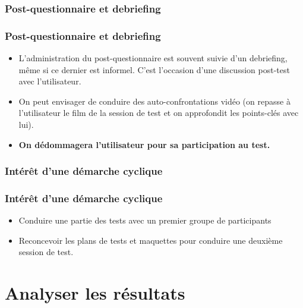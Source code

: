 \subsubsection{Post-questionnaire et debriefing} 
		
		\begin{frame}[allowframebreaks]
		\frametitle{Post-questionnaire et debriefing \citep{ergolab2014a}}
					\begin {itemize}
				      \item L'administration du post-questionnaire est souvent suivie d'un debriefing, même si ce dernier est informel. C'est l'occasion d'une discussion post-test avec l'utilisateur.
					\item On peut envisager de conduire des auto-confrontations vidéo (on repasse à l'utilisateur le film de la session de test et on approfondit les points-clés avec lui).
					\item \textbf{On dédommagera l'utilisateur pour sa participation au test. }
				   	\end{itemize}	
		\end{frame}   
		
\subsubsection{Intérêt d'une démarche cyclique} 
		
		\begin{frame}[allowframebreaks]
		\frametitle{Intérêt d'une démarche cyclique \citep{ergolab2014a}}
					\begin {itemize}
				      \item Conduire une partie des tests avec un premier groupe de participants
				      \item Reconcevoir les plans de tests et maquettes pour conduire une deuxième session de test. 
				   	\end{itemize}	
		\end{frame}     	 
	
	
\section{Analyser les résultats} 
